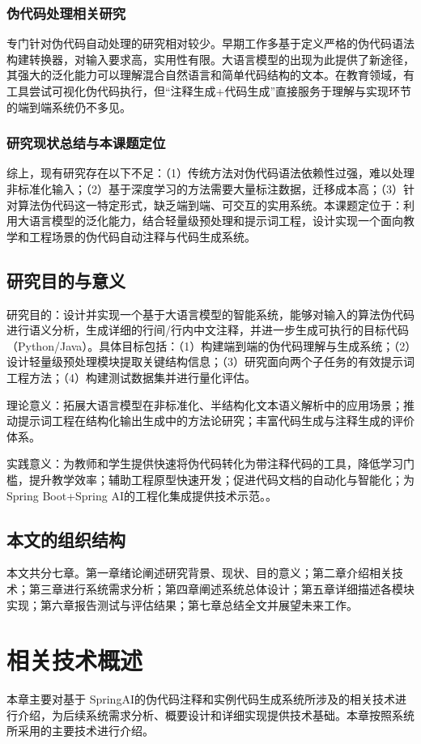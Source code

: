 \documentclass[twoside,openright]{xduugthesis}
\begin{document}
\subsection{伪代码处理相关研究}
专门针对伪代码自动处理的研究相对较少。早期工作多基于定义严格的伪代码语法构建转换器，对输入要求高，实用性有限。大语言模型的出现为此提供了新途径，其强大的泛化能力可以理解混合自然语言和简单代码结构的文本。在教育领域，有工具尝试可视化伪代码执行，但“注释生成+代码生成”直接服务于理解与实现环节的端到端系统仍不多见。
\subsection{研究现状总结与本课题定位}
综上，现有研究存在以下不足：（1）传统方法对伪代码语法依赖性过强，难以处理非标准化输入；（2）基于深度学习的方法需要大量标注数据，迁移成本高；（3）针对算法伪代码这一特定形式，缺乏端到端、可交互的实用系统。本课题定位于：利用大语言模型的泛化能力，结合轻量级预处理和提示词工程，设计实现一个面向教学和工程场景的伪代码自动注释与代码生成系统。
\section{研究目的与意义}
研究目的：设计并实现一个基于大语言模型的智能系统，能够对输入的算法伪代码进行语义分析，生成详细的行间/行内中文注释，并进一步生成可执行的目标代码（Python/Java）。具体目标包括：（1）构建端到端的伪代码理解与生成系统；（2）设计轻量级预处理模块提取关键结构信息；（3）研究面向两个子任务的有效提示词工程方法；（4）构建测试数据集并进行量化评估。

理论意义：拓展大语言模型在非标准化、半结构化文本语义解析中的应用场景；推动提示词工程在结构化输出生成中的方法论研究；丰富代码生成与注释生成的评价体系。

实践意义：为教师和学生提供快速将伪代码转化为带注释代码的工具，降低学习门槛，提升教学效率；辅助工程原型快速开发；促进代码文档的自动化与智能化；为Spring Boot+Spring AI的工程化集成提供技术示范。。

\section{本文的组织结构}
本文共分七章。第一章绪论阐述研究背景、现状、目的意义；第二章介绍相关技术；第三章进行系统需求分析；第四章阐述系统总体设计；第五章详细描述各模块实现；第六章报告测试与评估结果；第七章总结全文并展望未来工作。

\chapter{相关技术概述}
本章主要对基于 SpringAI的伪代码注释和实例代码生成系统所涉及的相关技术进行介绍，为后续系统需求分析、概要设计和详细实现提供技术基础。本章按照系统所采用的主要技术进行介绍。
\end{document}
